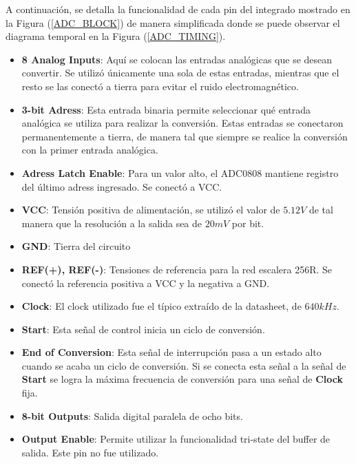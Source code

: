 A continuación, se detalla la funcionalidad de cada pin del integrado mostrado en la Figura (\ref{ADC_BLOCK}) de manera simplificada donde se puede observar el diagrama temporal en la Figura (\ref{ADC_TIMING}).

\begin{itemize}
\item \textbf{8 Analog Inputs}: Aquí se colocan las entradas analógicas que se desean convertir. Se utilizó únicamente una sola de estas entradas, mientras que el resto se las conectó a tierra para evitar el ruido electromagnético.
\item \textbf{3-bit Adress}: Esta entrada binaria permite seleccionar qué entrada analógica se utiliza para realizar la conversión. Estas entradas se conectaron permanentemente a tierra, de manera tal que siempre se realice la conversión con la primer entrada analógica.
\item \textbf{Adress Latch Enable}: Para un valor alto, el ADC0808 mantiene registro del último adress ingresado. Se conectó a VCC.
\item \textbf{VCC}: Tensión positiva de alimentación, se utilizó el valor de $5.12V$ de tal manera que la resolución a la salida sea de $20mV$ por bit.
\item \textbf{GND}: Tierra del circuito
\item \textbf{REF(+), REF(-)}: Tensiones de referencia para la red escalera 256R. Se conectó la referencia positiva a VCC y la negativa a GND.
\item \textbf{Clock}: El clock utilizado fue el típico extraído de la datasheet, de $640kHz$.
\item \textbf{Start}: Esta señal de control inicia un ciclo de conversión.
\item \textbf{End of Conversion}: Esta señal de interrupción pasa a un estado alto cuando se acaba un ciclo de conversión. Si se conecta esta señal a la señal de \textbf{Start} se logra la máxima frecuencia de conversión para una señal de \textbf{Clock} fija.
\item \textbf{8-bit Outputs}: Salida digital paralela de ocho bits.
\item \textbf{Output Enable}: Permite utilizar la funcionalidad tri-state del buffer de salida. Este pin no fue utilizado.
\end{itemize}

